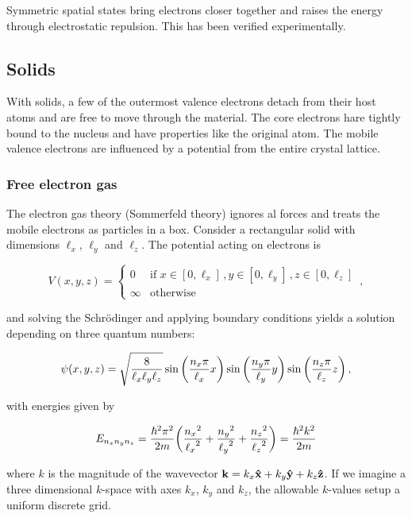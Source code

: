 \documentclass[12pt, titlepage]{article}
\begin{document}
Symmetric spatial states bring electrons closer together and raises the energy through electrostatic repulsion. This has been verified experimentally.


\subsection{Solids}
With solids, a few of the outermost valence electrons detach from their host atoms and are free to move through the material. The core electrons hare tightly bound to the nucleus and have properties like the original atom. The mobile valence electrons are influenced by a potential from the entire crystal lattice.

\subsubsection{Free electron gas}
The electron gas theory (Sommerfeld theory) ignores al forces and treats the mobile electrons as particles in a box. Consider a rectangular solid with dimensions $\ell_x$, $\ell_y$ and $\ell_z$. The potential acting on electrons is

\begin{equation}
	V(x,y,z) = 
	\begin{cases}
	0 & \text{if } x\in[0,\ell_x]\,,y\in[0,\ell_y]\,,z\in[0,\ell_z] \\[4pt]
	\infty & \text{otherwise}
	\end{cases} \,,
\end{equation}

and solving the Schrödinger and applying boundary conditions yields a solution depending on three quantum numbers:

\begin{equation}
	\psi(x,y,z) = \sqrt{\frac{8}{\ell_x\ell_y\ell_z}}\sin\qty(\frac{n_x \pi }{\ell_x}x)\sin\qty(\frac{n_y \pi }{\ell_y}y)\sin\qty(\frac{n_z \pi }{\ell_z}z) \,,
\end{equation} 

with energies given by

\begin{equation}
	E_{n_{x}n_{y}n_{z}} = \frac{\hbar^2\pi^2}{2m}\qty(\frac{{n_x}^2}{{\ell_x}^2} + \frac{{n_y}^2}{{\ell_y}^2} + \frac{{n_z}^2}{{\ell_z}^2}) = \frac{\hbar^2k^2}{2m}
\end{equation}

where $k$ is the magnitude of the wavevector $\vb{k} = k_x\vu{x} + k_y\vu{y} + k_z\vu{z}$. If we imagine a three dimensional $k$-space with axes $k_x$, $k_y$ and $k_z$, the allowable $k$-values setup a uniform discrete grid. 
\end{document}
